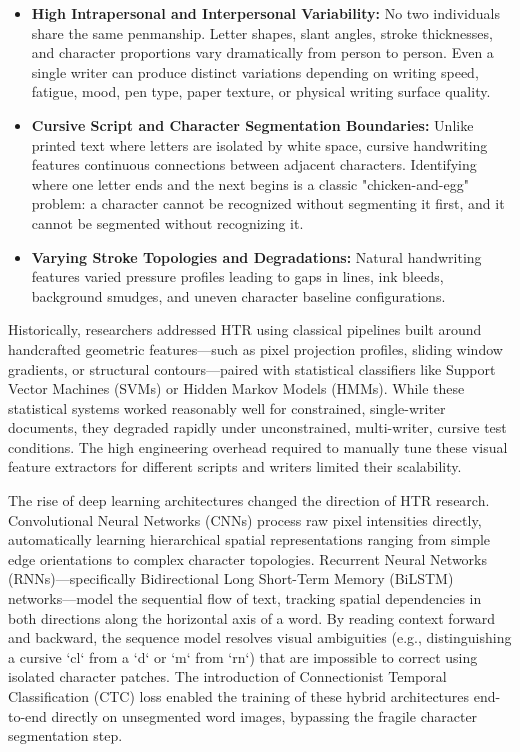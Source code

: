 \begin{itemize}
    \item \textbf{High Intrapersonal and Interpersonal Variability:} No two individuals share the same penmanship. Letter shapes, slant angles, stroke thicknesses, and character proportions vary dramatically from person to person. Even a single writer can produce distinct variations depending on writing speed, fatigue, mood, pen type, paper texture, or physical writing surface quality.
    \item \textbf{Cursive Script and Character Segmentation Boundaries:} Unlike printed text where letters are isolated by white space, cursive handwriting features continuous connections between adjacent characters. Identifying where one letter ends and the next begins is a classic "chicken-and-egg" problem: a character cannot be recognized without segmenting it first, and it cannot be segmented without recognizing it.
    \item \textbf{Varying Stroke Topologies and Degradations:} Natural handwriting features varied pressure profiles leading to gaps in lines, ink bleeds, background smudges, and uneven character baseline configurations.
\end{itemize}

Historically, researchers addressed HTR using classical pipelines built around handcrafted geometric features—such as pixel projection profiles, sliding window gradients, or structural contours—paired with statistical classifiers like Support Vector Machines (SVMs) or Hidden Markov Models (HMMs). While these statistical systems worked reasonably well for constrained, single-writer documents, they degraded rapidly under unconstrained, multi-writer, cursive test conditions. The high engineering overhead required to manually tune these visual feature extractors for different scripts and writers limited their scalability.

The rise of deep learning architectures changed the direction of HTR research. Convolutional Neural Networks (CNNs) process raw pixel intensities directly, automatically learning hierarchical spatial representations ranging from simple edge orientations to complex character topologies. Recurrent Neural Networks (RNNs)—specifically Bidirectional Long Short-Term Memory (BiLSTM) networks—model the sequential flow of text, tracking spatial dependencies in both directions along the horizontal axis of a word. By reading context forward and backward, the sequence model resolves visual ambiguities (e.g., distinguishing a cursive `cl` from a `d` or `m` from `rn`) that are impossible to correct using isolated character patches. The introduction of Connectionist Temporal Classification (CTC) loss enabled the training of these hybrid architectures end-to-end directly on unsegmented word images, bypassing the fragile character segmentation step.

